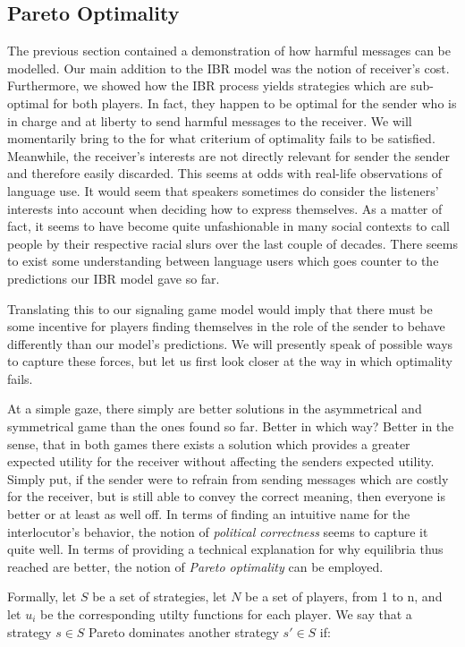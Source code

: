 \documentclass[10]{article}
\begin{document}
\subsection{Pareto Optimality}
The previous section contained a demonstration of how harmful messages can be modelled. Our main addition to the IBR model was the notion of receiver's cost. Furthermore, we showed how the IBR process yields strategies which are sub-optimal for both players. In fact, they happen to be optimal for the sender who is in charge and at liberty to send harmful messages to the receiver. We will momentarily bring to the for what criterium of optimality fails to be satisfied. Meanwhile, the receiver's interests are not directly relevant for sender the sender and therefore easily discarded. This seems at odds with real-life observations of language use. It would seem that speakers sometimes do consider the listeners' interests into account when deciding how to express themselves. As a matter of fact, it seems to have become quite unfashionable in many social contexts to call people by their respective racial slurs over the last couple of decades. There seems to exist some understanding between language users which goes counter to the predictions our IBR model gave so far.

Translating this to our signaling game model would imply that there must be some incentive for players finding themselves in the role of the sender to behave differently than our model's predictions. We will presently speak of possible ways to capture these forces, but let us first look closer at the way in which optimality fails.

At a simple gaze, there simply are better solutions in the asymmetrical and symmetrical game than the ones found so far. Better in which way? Better in the sense, that in both games there exists a solution which provides a greater expected utility for the receiver without affecting the senders expected utility. Simply put, if the sender were to refrain from sending messages which are costly for the receiver, but is still able to convey the correct meaning, then everyone is better or at least as well off. In terms of finding an intuitive name for the interlocutor's behavior, the notion of \textit{political correctness} seems to capture it quite well. In terms of providing a technical explanation for why equilibria thus reached are better, the notion of \textit{Pareto optimality} can be employed. 

Formally, let $S$ be a set of strategies, let $N$ be a set of players, from 1 to n, and let $u_i$ be the corresponding utilty functions for each player. We say that a strategy $s \in S$ Pareto dominates another strategy $s' \in S$ if:
\end{document}
